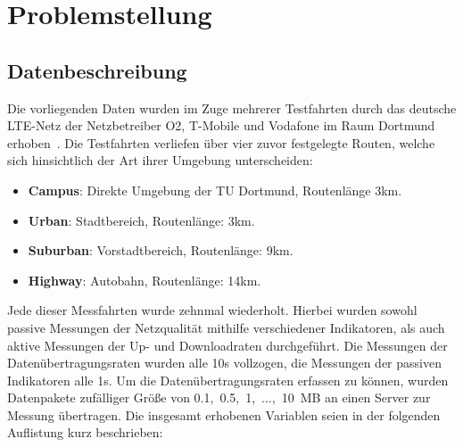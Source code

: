 \section{Problemstellung}

\subsection{Datenbeschreibung}
\label{sec:daten}

Die vorliegenden Daten wurden im Zuge mehrerer Testfahrten durch das deutsche LTE-Netz der Netzbetreiber O2,
T-Mobile und Vodafone im Raum Dortmund erhoben~\cite{IEEE}.
Die Testfahrten verliefen \"uber vier zuvor festgelegte Routen, welche sich hinsichtlich der Art ihrer Umgebung unterscheiden:
\begin{itemize}
    \item \textbf{Campus}: Direkte Umgebung der TU Dortmund, Routenl\"ange 3km.
    \item \textbf{Urban}: Stadtbereich, Routenl\"ange: 3km.
    \item \textbf{Suburban}: Vorstadtbereich, Routenl\"ange: 9km.
    \item \textbf{Highway}: Autobahn, Routenl\"ange: 14km.
\end{itemize}
Jede dieser Messfahrten wurde zehnmal wiederholt.
Hierbei wurden sowohl passive Messungen der Netzqualit\"at mithilfe verschiedener Indikatoren, als auch aktive
Messungen der Up- und Downloadraten durchgef\"uhrt.
Die Messungen der Da\-ten\-\"uber\-tra\-gungs\-ra\-ten wurden alle 10s vollzogen, die Messungen der passiven Indikatoren alle 1s.
Um die Da\-ten\-\"uber\-tra\-gungs\-ra\-ten erfassen zu k\"onnen,
wurden Datenpakete zuf\"alliger Gr\"o{\ss}e von \mbox{0.1, 0.5, 1, ..., 10 MB} an einen Server zur Messung \"ubertragen.
Die insgesamt erhobenen Variablen seien in der folgenden Auflistung kurz beschrieben:
